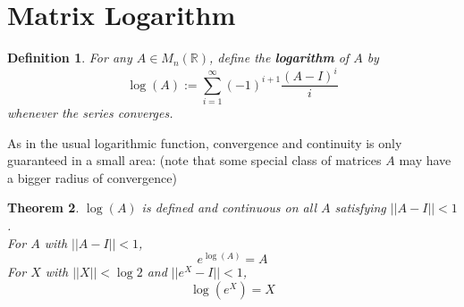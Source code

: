 \documentclass[11pt]{book}
\newtheorem{theorem}{Theorem}[section]
\newtheorem{definition}[theorem]{Definition}
\newcommand{\bb}[1]{\mathbb{#1}}
\begin{document}
\section{Matrix Logarithm}
\begin{definition}
For any $A \in M_{n}(\bb{R})$, define the \textbf{logarithm} of $A$ by
$$\log(A) := \sum_{i = 1}^{\infty} (-1)^{i+1} \frac{(A-I)^i}{i}$$
whenever the series converges.
\end{definition}
As in the usual logarithmic function, convergence and continuity is only guaranteed in a small area: (note that some special class of matrices $A$ may have a bigger radius of convergence)
\begin{theorem}
$\log (A)$ is defined and continuous on all $A$ satisfying $||A - I|| < 1$.\\
For $A$ with $||A-I||< 1$,
$$e^{\log(A)} = A$$
For $X$ with $||X||< \log 2$ and $||e^X - I||<1$,
$$\log (e^X) = X$$
\end{theorem}
\end{document}
